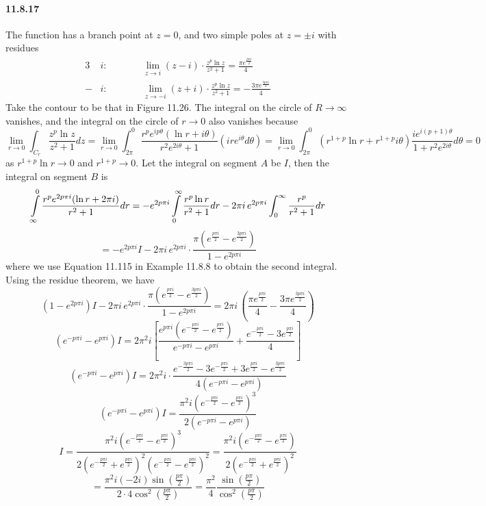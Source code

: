 \documentclass[a4paper]{article}
\begin{document}
\paragraph{11.8.17}
The function has a branch point at $z=0$, and two simple poles at $z=\pm i$ with residues
\begin{alignat*}{3}
    & i:\qquad && \lim_{z\to i}(z-i)\cdot\frac{z^p\ln z}{z^2+1}=\frac{\pi e^{\frac{p\pi i}{2}}}{4}\\
    - & i:\qquad && \lim_{z\to-i}(z+i)\cdot\frac{z^p\ln z}{z^2+1}=-\frac{3\pi e^{\frac{3p\pi i}{2}}}{4}
\end{alignat*}
Take the contour to be that in Figure 11.26. The integral on the circle of $R\to\infty$ vanishes, and the integral on the circle of $r\to0$ also vanishes because
\[
\lim_{r\to0}\int_{C_r}\frac{z^p\ln z}{z^2+1}dz=\lim_{r\to0}\int_{2\pi}^{0}\frac{r^pe^{ip\theta}(\ln r+i\theta)}{r^2e^{2i\theta}+1}(ire^{i\theta}d\theta)=\lim_{r\to0}\int_{2\pi}^0(r^{1+p}\ln r+r^{1+p}i\theta)\frac{ie^{i(p+1)\theta}}{1+r^2e^{2i\theta}}d\theta=0
\]
as $r^{1+p}\ln r\to0$ and $r^{1+p}\to0$. Let the integral on segment $A$ be $I$, then the integral on segment $B$ is
\[
\int\displaylimits_{\infty}^0\frac{r^pe^{2p\pi i}(\ln r+2\pi i)}{r^2+1}dr
=-e^{2p\pi i}\int\displaylimits_0^\infty\frac{r^p\ln r}{r^2+1}dr-2\pi i\,e^{2p\pi i}\int_0^\infty\frac{r^p}{r^2+1}dr
\]
\[=-e^{2p\pi i}I-2\pi i\,e^{2p\pi i}\cdot\frac{\pi(e^{\frac{p\pi i}{2}}-e^{\frac{3p\pi i}{2}})}{1-e^{2p\pi i}}
\]
where we use Equation 11.115 in Example 11.8.8 to obtain the second integral. Using the residue theorem, we have
\[
(1-e^{2p\pi i})I-2\pi i\,e^{2p\pi i}\cdot\frac{\pi(e^{\frac{p\pi i}{2}}-e^{\frac{3p\pi i}{2}})}{1-e^{2p\pi i}}=2\pi i\,(\frac{\pi e^{\frac{p\pi i}{2}}}{4}-\frac{3\pi e^{\frac{3p\pi i}{2}}}{4})
\]
\[
(e^{-p\pi i}-e^{p\pi i})I=2\pi^2i\left[\frac{e^{p\pi i}(e^{-\frac{p\pi i}{2}}-e^{\frac{p\pi i}{2}})}{e^{-p\pi i}-e^{p\pi i}}+\frac{e^{-\frac{p\pi i}{2}}-3e^{\frac{p\pi i}{2}}}{4} \right]
\]
\[
(e^{-p\pi i}-e^{p\pi i})I=2\pi^2i\cdot\frac{e^{-\frac{3p\pi i}{2}}-3e^{-\frac{p\pi i}{2}}+3e^{\frac{p\pi i}{2}}-e^{\frac{3p\pi i}{2}}}{4(e^{-p\pi i}-e^{p\pi i})}
\]
\[
(e^{-p\pi i}-e^{p\pi i})I=\frac{\pi^2i(e^{-\frac{p\pi i}{2}}-e^{\frac{p\pi i}{2}})^3}{2(e^{-p\pi i}-e^{p\pi i})}
\]
\[
I=\frac{\pi^2i(e^{-\frac{p\pi i}{2}}-e^{\frac{p\pi i}{2}})^3}{2(e^{-\frac{p\pi i}{2}}+e^{\frac{p\pi i}{2}})^2(e^{-\frac{p\pi i}{2}}-e^{\frac{p\pi i}{2}})^2}=\frac{\pi^2i(e^{-\frac{p\pi i}{2}}-e^{\frac{p\pi i}{2}})}{2(e^{-\frac{p\pi i}{2}}+e^{\frac{p\pi i}{2}})^2}
\]
\[
=\frac{\pi^2 i(-2i)\sin(\frac{p\pi}{2})}{2\cdot4\cos^2(\frac{p\pi}{2})}=\frac{\pi^2}{4}\frac{\sin(\frac{p\pi}{2})}{\cos^2(\frac{p\pi}{2})}
\]
\end{document}
